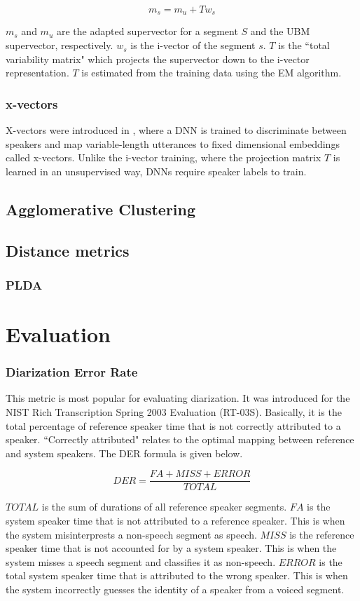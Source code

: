 		$$ m_s = m_u + Tw_s $$
		
		$m_s$ and $m_u$ are the adapted supervector for a segment $S$ and the UBM supervector, respectively. $w_s$ is the i-vector of the segment $s$. $T$ is the ``total variability matrix" which projects the supervector down to the i-vector representation. $T$ is estimated from the training data using the EM algorithm.
		
		\subsubsection{x-vectors}
		X-vectors were introduced in \cite{snyder2018x}, where a DNN is trained to discriminate between speakers and map variable-length utterances to fixed dimensional embeddings called x-vectors. Unlike the i-vector training, where the projection matrix $T$ is learned in an unsupervised way, DNNs require speaker labels to train.
				
	\subsection{Agglomerative Clustering}

	\subsection{Distance metrics}
		\subsubsection{PLDA}

\section{Evaluation}

	\subsubsection{Diarization Error Rate}
		This metric is most popular for evaluating diarization. It was introduced for the NIST Rich Transcription Spring 2003 Evaluation (RT-03S). Basically, it is the total percentage of reference speaker time that is not correctly attributed to a speaker. ``Correctly attributed" relates to the optimal mapping between reference and system speakers. The DER formula is given below.
		
		$$ DER = \frac{FA + MISS + ERROR}{TOTAL} $$
		
		$TOTAL$ is the sum of durations of all reference speaker segments.
		$FA$ is the system speaker time that is not attributed to a reference speaker. This is when the system misinterprests a non-speech segment as speech.
		$MISS$ is the reference speaker time that is not accounted for by a system speaker. This is when the system misses a speech segment and classifies it as non-speech.
		$ERROR$ is the total system speaker time that is attributed to the wrong speaker. This is when the system incorrectly guesses the identity of a speaker from a voiced segment.
		
